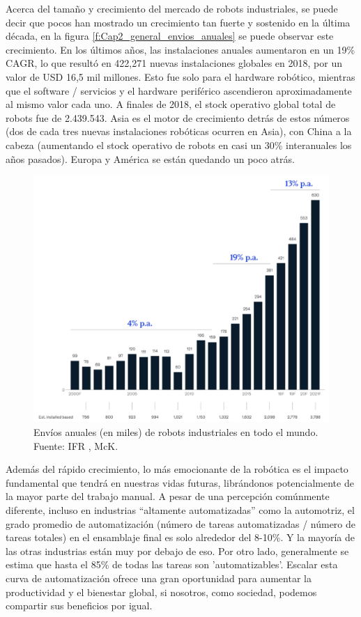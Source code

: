         \newpage


    Acerca del tamaño y crecimiento del mercado de robots industriales, se puede decir que pocos han mostrado un crecimiento tan fuerte y sostenido en la última década, en la figura \eqref{f:Cap2_general_envios_anuales} se puede observar este crecimiento. En los últimos años, las instalaciones anuales aumentaron en un 19\% CAGR, lo que resultó en 422,271 nuevas instalaciones globales en 2018, por un valor de USD 16,5 mil millones. Esto fue solo para el hardware robótico, mientras que el software / servicios y el hardware periférico ascendieron aproximadamente al mismo valor cada uno. A finales de 2018, el stock operativo global total de robots fue de 2.439.543. Asia es el motor de crecimiento detrás de estos números (dos de cada tres nuevas instalaciones robóticas ocurren en Asia), con China a la cabeza (aumentando el stock operativo de robots en casi un 30\% interanuales los años pasados). Europa y América se están quedando un poco atrás. 
    \begin{figure}[H]
        \centering
        \includegraphics[width=0.67\linewidth]{Main/Chapter2/Images2/envios-anuales-robots.png}
        \caption{Envíos anuales (en miles) de robots industriales en todo el mundo. Fuente: IFR , McK.\cite{growth_Insights}}
        \label{f:Cap2_general_envios_anuales}
    \end{figure}
    Además del rápido crecimiento, lo más emocionante de la robótica es el impacto fundamental que tendrá en nuestras vidas futuras, librándonos potencialmente de la mayor parte del trabajo manual. A pesar de una percepción comúnmente diferente, incluso en industrias “altamente automatizadas” como la automotriz, el grado promedio de automatización (número de tareas automatizadas / número de tareas totales) en el ensamblaje final es solo alrededor del 8-10\%. Y la mayoría de las otras industrias están muy por debajo de eso. Por otro lado, generalmente se estima que hasta el 85\% de todas las tareas son 'automatizables'. Escalar esta curva de automatización ofrece una gran oportunidad para aumentar la productividad y el bienestar global, si nosotros, como sociedad, podemos compartir sus beneficios por igual.
    
